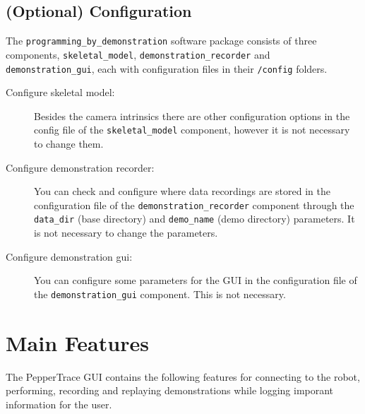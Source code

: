 \documentclass{CSSRforAfrica}
\begin{document}
\newpage

\subsection*{(Optional) Configuration}
The \texttt{programming\_by\_demonstration} software package consists of three components, \texttt{skeletal\_model}, \texttt{demonstration\_recorder} and \texttt{demonstration\_gui}, each with configuration files in their \texttt{/config} folders. 

\begin{description}
    
    \item[Configure skeletal model:] Besides the camera intrinsics there are other configuration options in the config file of the \texttt{skeletal\_model} component, however it is not necessary to change them. 
        
    \item[Configure demonstration recorder: ] You can check and  configure where data recordings are stored in the configuration file of the \texttt{demonstration\_recorder} component through the \texttt{data\_dir} (base directory) and \texttt{demo\_name} (demo directory) parameters. It is not necessary to change the parameters.

    \item[Configure demonstration gui: ] You can configure some parameters for the GUI in the configuration file of the \texttt{demonstration\_gui} component. This is not necessary. 
       
    
\end{description}



\newpage

\section*{Main Features}

The PepperTrace GUI contains the following features for connecting to the robot, performing, recording and replaying demonstrations while logging imporant information for the user. 
\end{document}
